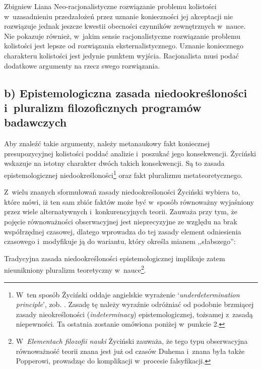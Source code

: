 \begin{artplenv}{Zbigniew Liana}
Neo-racjonalistyczne rozwiązanie problemu kolistości w~uzasadnieniu przedzałożeń przez uznanie konieczności jej akceptacji nie rozwiązuje jednak jeszcze kwestii obecności czynników zewnętrznych w~nauce. Nie pokazuje również, w~jakim sensie racjonalistyczne rozwiązanie problemu kolistości jest lepsze od rozwiązania eksternalistycznego. Uznanie koniecznego charakteru kolistości jest jedynie punktem wyjścia. Racjonalista musi podać dodatkowe argumenty na rzecz swego rozwiązania.

\subsection{b) Epistemologiczna zasada niedookreśloności i~pluralizm filozoficznych programów badawczych}

Aby znaleźć takie argumenty, należy metanaukowy fakt koniecznej presupozycyjnej kolistości poddać analizie i~poszukać jego konsekwencji. Życiński wskazuje na istotny charakter dwóch takich konsekwencji. Są to zasada epistemologicznej niedookreśloności\footnote{W~ten sposób Życiński oddaje angielskie wyrażenie `\textit{underdetermination principle}', zob.
\parencite[][s.~129n]{zycinski_teizm_1985}. %
 Zasadę tę należy wyraźnie odróżniać od podobnie brzmiącej zasady nieokreśloności (\textit{indeterminacy}) epistemologicznej, tożsamej z~zasadą niepewności. Ta ostatnia zostanie omówiona poniżej w~punkcie 2.} oraz fakt pluralizmu metateoretycznego.

Z~wielu znanych sformułowań zasady niedookreśloności Życiński wybiera to, które mówi, iż ten sam zbiór faktów może być w~sposób równoważny wyjaśniony przez wiele alternatywnych i~konkurencyjnych teorii. Zauważa przy tym, że pojęcie równoważności obserwacyjnej jest nieprecyzyjne ze względu na brak współrzędnej czasowej, dlatego wprowadza do tej zasady element odniesienia czasowego i~modyfikuje ją do wariantu, który określa mianem ,,słabszego'':

Tradycyjna zasada niedookreśloności epistemologicznej implikuje zatem nieunikniony pluralizm teoretyczny w~nauce\footnote{W~\textit{Elementach filozofii nauki}
\parencites[][s.~106n]{zycinski_elementy_1996}[][s.~143]{zycinski_elementy_2015} %
 Życiński zauważa, że tego typu obserwacyjna równoważność teorii znana jest już od czasów Duhema i~znana była także Popperowi, prowadząc do komplikacji w~procesie falsyfikacji.}.


\end{artplenv}
